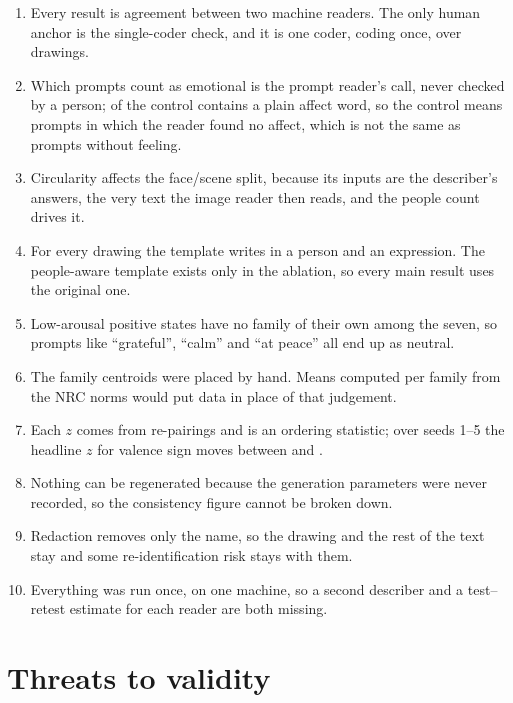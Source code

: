 \begin{enumerate}
\item Every result is agreement between two machine readers. The only human anchor is the single-coder check, and it is one coder, coding once, over \HcN{} drawings.
\item Which prompts count as emotional is the prompt reader's call, never checked by a person; \CtrlFlaggedPct{} of the control contains a plain affect word, so the control means prompts in which the reader found no affect, which is not the same as prompts without feeling.
\item Circularity affects the face/scene split, because its inputs are the describer's answers, the very text the image reader then reads, and the people count drives it.
\item For every drawing the template writes in a person and an expression. The people-aware template exists only in the ablation, so every main result uses the original one.
\item Low-arousal positive states have no family of their own among the seven, so prompts like ``grateful'', ``calm'' and ``at peace'' all end up as neutral.
\item The family centroids were placed by hand. Means computed per family from the NRC norms \cite{mohammad2018obtaining} would put data in place of that judgement.
\item Each $z$ comes from \nullShuffles{} re-pairings and is an ordering statistic; over seeds 1--5 the headline $z$ for valence sign moves between \ZSeedMin{} and \ZSeedMax{}.
\item Nothing can be regenerated because the generation parameters were never recorded, so the consistency figure cannot be broken down.
\item Redaction removes only the name, so the drawing and the rest of the text stay and some re-identification risk stays with them.
\item Everything was run once, on one machine, so a second describer and a test--retest estimate for each reader are both missing.
\end{enumerate}

\section{Threats to validity}
\label{sec:disc-threats}

